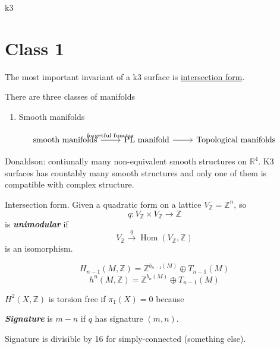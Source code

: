





{\Huge k3}

\section{Class 1}

The most important invariant of a k3 surface is \href{https://en.wikipedia.org/wiki/Intersection_form_of_a_4-manifold}{intersection form}.

There are three classes of manifolds
\begin{enumerate}
	\item Smooth manifolds
\end{enumerate}

\[\begin{tikzcd}
	\text{smooth manifolds}\arrow[r,"\text{forgetful functor} "]&\text{PL manifold}\arrow[r]&\text{Topological manifolds}   
\end{tikzcd}\]

Donaldson: contiunally many non-equivalent smooth structures on $\mathbb{R}^{4}$. K3 surfaces has countably many smooth structures and only one of them is compatible with complex structure.

\begin{defn}
	Intersection form. Given a quadratic form on a lattice $V_{\mathbb{Z}}=\mathbb{Z}^n$, so 
	 \[q:V_{\mathbb{Z}}\times V_{\mathbb{Z}}\to \mathbb{Z}\]
	 is \textit{\textbf{unimodular}} if 
	 \[V_{\mathbb{Z}}\overset{q}{\longrightarrow} \operatorname{Hom}(V_{\mathbb{Z}},\mathbb{Z})\]
	 is an isomorphism.
\end{defn}

\begin{thm}\leavevmode
	\[H_{n-1}(M,\mathbb{Z})=\mathbb{Z}^{b_{n-1}(M)}\oplus T_{n-1}(M)\]
	\[h^n(M,\mathbb{Z})=\mathbb{Z}^{b_{n}(M)}\oplus T_{n-1}(M)\]
\end{thm}

\begin{coro}
	$H^2(X,\mathbb{Z})$ is torsion free if $\pi_{1}(X) =0$ because 
\end{coro}

\begin{defn}
	\textit{\textbf{Signature}} is $m-n$ if $q$ has signature $(m,n)$.
\end{defn}

\begin{thm}[Rokhlm-Wu?]\leavevmode
	Signature is divisible by 16 for simply-connected (something else).
\end{thm}

